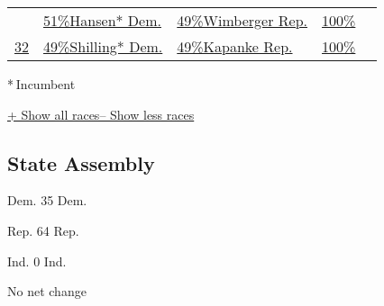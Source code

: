 \begin{longtable}[]{@{}lllll@{}}
&
\href{//www.nytimes3xbfgragh.onion/elections/2016/results/wisconsin-state-senate-district-30}{
51\%Hansen* Dem.} &
\href{//www.nytimes3xbfgragh.onion/elections/2016/results/wisconsin-state-senate-district-30}{
49\%Wimberger Rep.} &
\href{//www.nytimes3xbfgragh.onion/elections/2016/results/wisconsin-state-senate-district-30}{100\%}
&
\href{//www.nytimes3xbfgragh.onion/elections/2016/results/wisconsin-state-senate-district-30}{}\tabularnewline
\href{//www.nytimes3xbfgragh.onion/elections/2016/results/wisconsin-state-senate-district-32}{32}
&
\href{//www.nytimes3xbfgragh.onion/elections/2016/results/wisconsin-state-senate-district-32}{
49\%Shilling* Dem.} &
\href{//www.nytimes3xbfgragh.onion/elections/2016/results/wisconsin-state-senate-district-32}{
49\%Kapanke Rep.} &
\href{//www.nytimes3xbfgragh.onion/elections/2016/results/wisconsin-state-senate-district-32}{100\%}
&
\href{//www.nytimes3xbfgragh.onion/elections/2016/results/wisconsin-state-senate-district-32}{}\tabularnewline
\bottomrule
\end{longtable}

* Incumbent~

\protect\hyperlink{}{+ Show all races-- Show less races}

\hypertarget{state-assembly}{%
\subsection{State Assembly}\label{state-assembly}}

Dem. 35 Dem.

Rep. 64 Rep.

Ind. 0 Ind.

No net change


